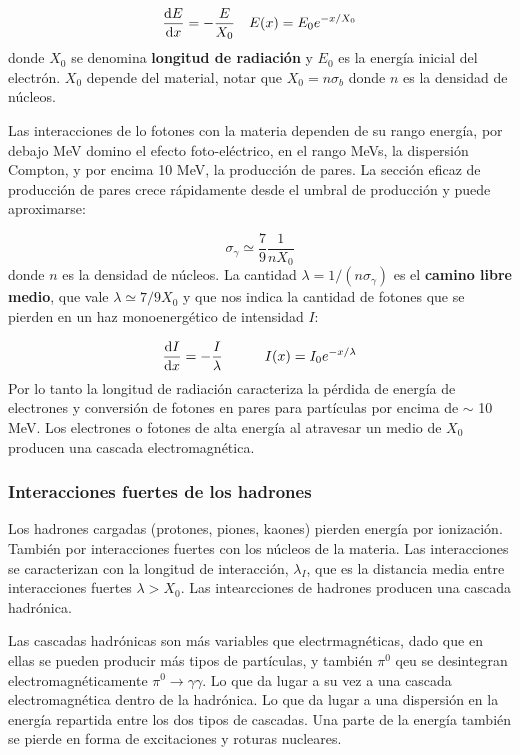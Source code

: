 \begin{equation}
	\frac{\mathrm{d} E}{\mathrm{d} x} = - \frac{E}{X_0} \quad E(x)=E_0 e^{-x/X_0}
\end{equation}
donde $X_0$ se denomina \textbf{longitud de radiación} y $E_0$ es la energía inicial del electrón. $X_0$ depende del material, notar que $X_0=n\sigma_b$ donde $n$ es la densidad de núcleos.

Las interacciones de lo fotones con la materia dependen de su rango energía, por debajo MeV domino el efecto foto-eléctrico, en el rango MeVs, la dispersión Compton, y por encima 10 MeV, la producción de pares. La sección eficaz de producción de pares crece rápidamente desde el umbral de producción y puede aproximarse:

\begin{equation}
	\sigma_\gamma \simeq \frac{7}{9} \frac{1}{nX_0}
\end{equation}
donde $n$ es la densidad de núcleos. La cantidad $\lambda=1/(n\sigma_\gamma)$ es el \textbf{camino libre medio}, que vale $\lambda\simeq7/9 X_0$ y que nos indica la cantidad de fotones que se pierden en un haz monoenergético de intensidad $I$:

\begin{equation}
	\frac{\mathrm{d} I}{\mathrm{d} x} = - \frac{I}{\lambda} \quad \quad \quad I(x) = I_0 e^{-x/\lambda}
\end{equation}
Por lo tanto la longitud de radiación caracteriza la pérdida de energía de electrones y conversión de fotones en pares para partículas por encima de $\sim$ 10 MeV. Los electrones o fotones de alta energía al atravesar un medio de $X_0$ producen una cascada electromagnética. 

\subsubsection{Interacciones fuertes de los hadrones}

Los hadrones cargadas (protones, piones, kaones) pierden energía por ionización. También por interacciones fuertes con los núcleos de la materia. Las interacciones se caracterizan con la longitud de interacción, $\lambda_I$, que es la distancia media entre interacciones fuertes $\lambda > X_0$. Las intearcciones de hadrones producen una cascada hadrónica. 

Las cascadas hadrónicas son más variables que electrmagnéticas, dado que en ellas se pueden producir más tipos de partículas, y también $\pi^0$ qeu se desintegran electromagnéticamente $\pi^0 \rightarrow \gamma \gamma$. Lo que da lugar a su vez a una cascada electromagnética dentro de la hadrónica. Lo que da lugar a una dispersión en la energía repartida entre los dos tipos de cascadas. Una parte de la energía también se pierde en forma de excitaciones y roturas nucleares.

